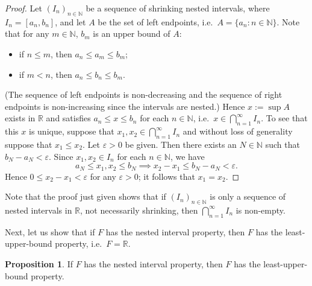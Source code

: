 \documentclass[12pt]{article}
\theoremstyle{definition}
\newtheorem{proposition}[definition]{Proposition}
\begin{document}
\begin{proof}
    Let \( (I_n)_{n \in \mathbb{N}} \) be a sequence of shrinking nested intervals, where \( I_n = [a_n, b_n] \), and let \( A \) be the set of left endpoints, i.e.\ \( A = \{ a_n : n \in \mathbb{N} \} \). Note that for any \( m \in \mathbb{N} \), \( b_m \) is an upper bound of \( A \):
    \begin{itemize}
        \item if \( n \leq m\), then \( a_n \leq a_m \leq b_m \);
        \item if \( m < n \), then \( a_n \leq b_n \leq b_m \).
    \end{itemize}
    (The sequence of left endpoints is non-decreasing and the sequence of right endpoints is non-increasing since the intervals are nested.) Hence \( x := \sup A \) exists in \( \mathbb{R} \) and satisfies \( a_n \leq x \leq b_n \) for each \( n \in \mathbb{N} \), i.e.\ \( x \in \bigcap_{n=1}^{\infty} I_n \). To see that this \( x \) is unique, suppose that \( x_1, x_2 \in \bigcap_{n=1}^{\infty} I_n \) and without loss of generality suppose that \( x_1 \leq x_2 \). Let \( \varepsilon > 0 \) be given. Then there exists an \( N \in \mathbb{N} \) such that \( b_N - a_N < \varepsilon \). Since \( x_1, x_2 \in I_n \) for each \( n \in \mathbb{N} \), we have
    \[
        a_N \leq x_1, x_2 \leq b_N \implies x_2 - x_1 \leq b_N - a_N < \varepsilon.
    \]
    Hence \( 0 \leq x_2 - x_1 < \varepsilon \) for any \( \varepsilon > 0 \); it follows that \( x_1 = x_2 \).
\end{proof}

Note that the proof just given shows that if \( (I_n)_{n \in \mathbb{N}} \) is only a sequence of nested intervals in \( \mathbb{R} \), not necessarily shrinking, then \( \bigcap_{n=1}^{\infty} I_n \) is non-empty.

Next, let us show that if \( F \) has the nested interval property, then \( F \) has the least-upper-bound property, i.e.\ \( F = \mathbb{R} \).

\begin{proposition}
\label{prop:nip_implies_lub}
    If \( F \) has the nested interval property, then \( F \) has the least-upper-bound property.
\end{proposition}
\end{document}
